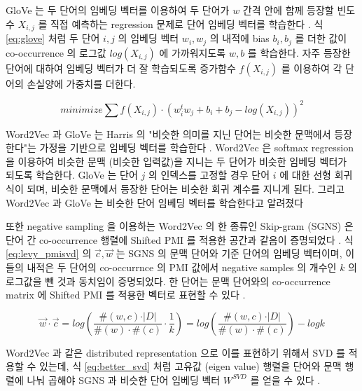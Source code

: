 \documentclass[11pt]{article}
\begin{document}
GloVe 는 두 단어의 임베딩 벡터를 이용하여 두 단어가 $w$ 간격 안에 함께 등장할 빈도수 $X_{i,j}$ 를 직접 예측하는 regression 문제로 단어 임베딩 벡터를 학습한다 \citep{pennington2014glove}.
식 \ref{eq:glove} 처럼 두 단어 $i, j$ 의 임베딩 벡터 $w_i, w_j$ 의 내적에 bias $b_i, b_j$ 를 더한 값이 co-occurrence 의 로그값 $log(X_{i,j})$ 에 가까워지도록 $w, b$ 를 학습한다.
자주 등장한 단어에 대하여 임베딩 벡터가 더 잘 학습되도록 증가함수 $f(X_{i,j})$ 를 이용하여 각 단어의 손실양에 가중치를 더한다.

\begin{equation}
  \label{eq:glove}
  minimize \sum f(X_{i,j}) \cdot \left( w_i^t w_j + b_i + b_j - log(X_{i,j}) \right)^2
\end{equation}

Word2Vec 과 GloVe 는 Harris 의 "비슷한 의미를 지닌 단어는 비슷한 문맥에서 등장한다"는 가정을 기반으로 임베딩 벡터를 학습한다 \citep{harris1954distributional}.
Word2Vec 은 softmax regression 을 이용하여 비슷한 문맥 (비슷한 입력값)을 지니는 두 단어가 비슷한 임베딩 벡터가 되도록 학습한다.
GloVe 는 단어 $j$ 의 인덱스를 고정할 경우 단어 $i$ 에 대한 선형 회귀식이 되며, 비슷한 문맥에서 등장한 단어는 비슷한 회귀 계수를 지니게 된다.
그리고 Word2Vec 과 GloVe 는 비슷한 단어 임베딩 벡터를 학습한다고 알려졌다 \citep{levy2015improving}

또한 negative sampling 을 이용하는 Word2Vec 의 한 종류인 Skip-gram (SGNS) 은 단어 간 co-occurrence 행렬에 Shifted PMI 를 적용한 공간과 같음이 증명되었다 \citep{levy2014neural}.
식 \ref{eq:levy_pmisvd} 의 $\vec{c}, \vec{w}$ 는 SGNS 의 문맥 단어와 기준 단어의 임베딩 벡터이며, 이들의 내적은 두 단어의 co-occurrnce 의 PMI 값에서 negative samples 의 개수인 $k$ 의 로그값을 뺀 것과 동치임이 증명되었다.
한 단어는 문맥 단어와의 co-occurrence matrix 에 Shifted PMI 를 적용한 벡터로 표현할 수 있다 \citep{levy2014neural}.

\begin{equation}
  \label{eq:levy_pmisvd}
  \vec{w} \cdot \vec{c} = log \left( \frac{\#(w,c) \cdot \vert D \vert}{\#(w) \cdot \#(c)} \cdot \frac{1}{k} \right) = log \left( \frac{\#(w,c) \cdot \vert D \vert}{\#(w) \cdot \#(c)} \right) - log k
\end{equation}

Word2Vec 과 같은 distributed representation 으로 이를 표현하기 위해서 SVD 를 적용할 수 있는데, 식 \ref{eq:better_svd} 처럼 고유값 (eigen value) 행렬을 단어와 문맥 행렬에 나눠 곱해야 SGNS 과 비슷한 단어 임베딩 벡터 $W^{SVD}$ 를 얻을 수 있다 \citep{levy2015improving}.
\end{document}
